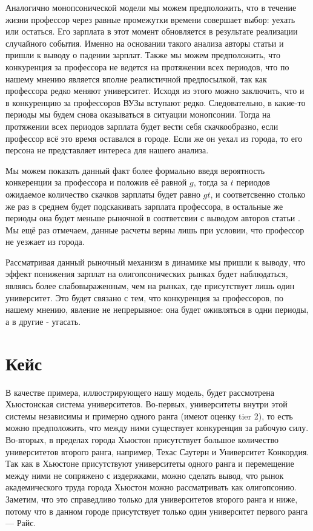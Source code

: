 \documentclass[a4paper, 12pt]{article}
\theoremstyle{definition}
\theoremstyle{plain}
\begin{document}
Аналогично монопсонической модели мы можем предположить, что в течение жизни профессор через равные промежутки времени совершает выбор: уехать или остаться. Его зарплата в этот момент обновляется в результате реализации случайного события. Именно на основании такого анализа авторы статьи \cite{1} и пришли к выводу о падении зарплат. Также мы можем предположить, что конкуренция за профессора не ведется на протяжении всех периодов, что по нашему мнению является вполне реалистичной предпосылкой, так как профессора редко меняют университет. Исходя из этого можно заключить, что и в конкуренцию за профессоров ВУЗы вступают редко. Следовательно, в какие-то периоды мы будем снова оказываться в ситуации монопсонии. Тогда на протяжении всех периодов зарплата будет вести себя скачкообразно, если профессор всё это время оставался в городе. Если же он уехал из города, то его персона не представляет интереса для нашего анализа. 

Мы можем показать данный факт более формально введя вероятность конкеренции за профессора и положив её равной $g$, тогда за $t$ периодов ожидаемое количество скачков зарплаты будет равно $gt$, и соответсвенно столько же раз в среднем будет подскакивать зарплата профессора, в остальные же периоды она будет меньше рыночной в соответсвии с выводом авторов статьи \cite{1}. Мы ещё раз отмечаем, данные расчеты верны лишь при условии, что профессор не уезжает из города. 

Рассматривая данный рыночный механизм в динамике мы пришли к выводу, что эффект понижения зарплат на олигопсонических рынках будет наблюдаться, являясь более слабовыраженным, чем на рынках, где присутствует лишь один университет. Это будет связано с тем, что конкуренция за профессоров, по нашему мнению, явление не непрерывное: она будет оживляться в одни периоды, а в другие - угасать.

\section{Кейс}

В качестве примера, иллюстрирующего нашу модель, будет рассмотрена Хьюстонская система университетов. Во-первых, университеты внутри этой системы независимы и примерно одного ранга (имеют оценку tier 2), то есть можно предположить, что между ними существует конкуренция за рабочую силу. Во-вторых, в пределах города Хьюстон присутствует большое количество университетов второго ранга, например, Техас Саутерн и Университет Конкордия. Так как в Хьюстоне присутствуют университеты одного ранга и перемещение между ними не сопряжено с издержками, можно сделать вывод, что рынок академического труда города Хьюстон можно рассматривать как олигопсонию. Заметим, что это справедливо только для университетов второго ранга и ниже, потому что в данном городе присутствует только один университет первого ранга — Райс.
\end{document}
